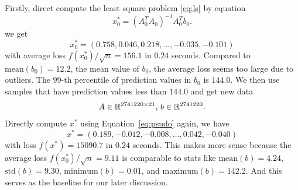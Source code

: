 Firstly, direct compute the least square problem \eqref{eq:ls}
by equation
\begin{equation} \label{eq:psudo}
    x_0^*=(A_0^TA_0)^{-1}A_0^Tb_0.
\end{equation}
we get
$$
    x_0^*=(0.758, 0.046, 0.218, \dots, -0.035, -0.101)
$$
with average loss $f(x_0^*)/\sqrt{n} = 156.1$ in $0.24$ seconds.
Compared to $\text{mean}(b_0)=12.2$, the mean value of $b_0$,
the average loss seems too large due to outliers.
The $99$-th percentile of prediction values in $b_0$ is $144.0$.
We then use samples that have prediction values less than $144.0$
and get new data
\begin{equation}
    A \in {\mathbb{R}}^{2741220\times 21}, \,
    b\in{\mathbb{R}}^{2741220}.
\end{equation}
Directly compute $x^*$ using Equation~\eqref{eq:psudo} again, we have
$$
    x^*=(0.189, -0.012, -0.008, \dots, 0.042, -0.040)
$$
with loss $f(x^*) = 15090.7$ in $0.24$ seconds.
This makes more sense because
the average loss
$f(x_0^*)/\sqrt{n} = 9.11$
is comparable to stats like
$\text{mean}(b)=4.24$,
$\text{std}(b) = 9.30$,
$\text{minimum}(b) = 0.01$, and
$\text{maximum}(b) = 142.2$.
And this serves as the baseline for our later discussion.
